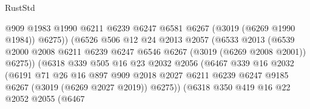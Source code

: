 \begin{lexlean}{RustStd}
\begin{coremodule}
                                  @909
                                  @1983
                                  @1990
                                  @6211
                                  @6239
                                  @6247
                                  @6581
                                  @6267
                                  (@3019 (@6269 @1990 @1984))
                                  @6275))
                              (@6526
                                @506
                                @12
                                @24
                                @2013
                                @2057
                                (@6533
                                  @2013
                                  (@6539
                                    @2000
                                    @2008
                                    @6211
                                    @6239
                                    @6247
                                    @6546
                                    @6267
                                    (@3019 (@6269 @2008 @2001))
                                    @6275))
                                (@6318
                                  @339
                                  @505
                                  @16
                                  @23
                                  @2032
                                  @2056
                                  (@6467
                                    @339
                                    @16
                                    @2032
                                    (@6191
                                      @71
                                      @26
                                      @16
                                      @897
                                      @909
                                      @2018
                                      @2027
                                      @6211
                                      @6239
                                      @6247
                                      @9185
                                      @6267
                                      (@3019 (@6269 @2027 @2019))
                                      @6275))
                                  (@6318
                                    @350
                                    @419
                                    @16
                                    @22
                                    @2052
                                    @2055
                                    (@6467

\end{coremodule}
\end{lexlean}
